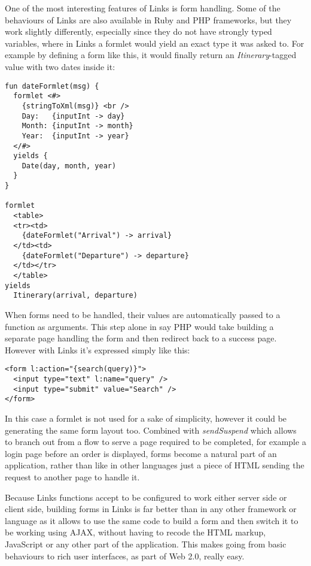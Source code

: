 One of the most interesting features of Links is form handling. Some of the behaviours of Links are also available in Ruby and PHP frameworks, but they work slightly differently, especially since they do not have strongly typed variables, where in Links a formlet would yield an exact type it was asked to. For example by defining a form like this, it would finally return an \textit{Itinerary}-tagged value with two dates inside it:

\begin{codelisting}
\begin{verbatim}
fun dateFormlet(msg) {
  formlet <#>
    {stringToXml(msg)} <br />
    Day:   {inputInt -> day}
    Month: {inputInt -> month}
    Year:  {inputInt -> year}
  </#>
  yields {
    Date(day, month, year)
  }
}

formlet
  <table>
  <tr><td>
    {dateFormlet("Arrival") -> arrival}
  </td><td>
    {dateFormlet("Departure") -> departure}
  </td></tr>
  </table>
yields
  Itinerary(arrival, departure)
\end{verbatim}
\end{codelisting}

When forms need to be handled, their values are automatically passed to a function as arguments. This step alone in say PHP would take building a separate page handling the form and then redirect back to a success page. However with Links it's expressed simply like this:

\begin{codelisting}
\begin{verbatim}
<form l:action="{search(query)}">
  <input type="text" l:name="query" />
  <input type="submit" value="Search" />
</form>
\end{verbatim}
\end{codelisting}

In this case a formlet is not used for a sake of simplicity, however it could be generating the same form layout too. Combined with \textit{sendSuspend} which allows to branch out from a flow to serve a page required to be completed, for example a login page before an order is displayed, forms become a natural part of an application, rather than like in other languages just a piece of HTML sending the request to another page to handle it.

Because Links functions accept to be configured to work either server side or client side, building forms in Links is far better than in any other framework or language as it allows to use the same code to build a form and then switch it to be working using AJAX, without having to recode the HTML markup, JavaScript or any other part of the application. This makes going from basic behaviours to rich user interfaces, as part of Web 2.0, really easy. 